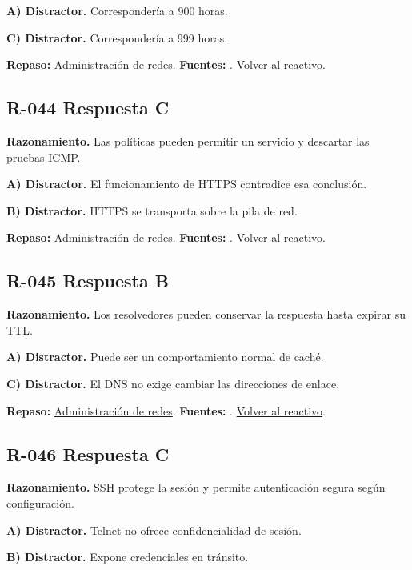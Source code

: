 \textbf{A) Distractor. }Correspondería a 900 horas.

\textbf{C) Distractor. }Correspondería a 999 horas.

\textbf{Repaso:} \hyperref[sec:r2]{Administración de redes}. \textbf{Fuentes:} \cite{rfc2131,rfc1034,rfc9293,networks}. \hyperref[q:R-043]{Volver al reactivo}.\par\medskip

\subsection*{R-044 \quad Respuesta C}\label{s:R-044}
\textbf{Razonamiento.} Las políticas pueden permitir un servicio y descartar las pruebas ICMP.

\textbf{A) Distractor. }El funcionamiento de HTTPS contradice esa conclusión.

\textbf{B) Distractor. }HTTPS se transporta sobre la pila de red.

\textbf{Repaso:} \hyperref[sec:r2]{Administración de redes}. \textbf{Fuentes:} \cite{rfc2131,rfc1034,rfc9293,networks}. \hyperref[q:R-044]{Volver al reactivo}.\par\medskip

\subsection*{R-045 \quad Respuesta B}\label{s:R-045}
\textbf{Razonamiento.} Los resolvedores pueden conservar la respuesta hasta expirar su TTL.

\textbf{A) Distractor. }Puede ser un comportamiento normal de caché.

\textbf{C) Distractor. }El DNS no exige cambiar las direcciones de enlace.

\textbf{Repaso:} \hyperref[sec:r2]{Administración de redes}. \textbf{Fuentes:} \cite{rfc2131,rfc1034,rfc9293,networks}. \hyperref[q:R-045]{Volver al reactivo}.\par\medskip

\subsection*{R-046 \quad Respuesta C}\label{s:R-046}
\textbf{Razonamiento.} SSH protege la sesión y permite autenticación segura según configuración.

\textbf{A) Distractor. }Telnet no ofrece confidencialidad de sesión.

\textbf{B) Distractor. }Expone credenciales en tránsito.

